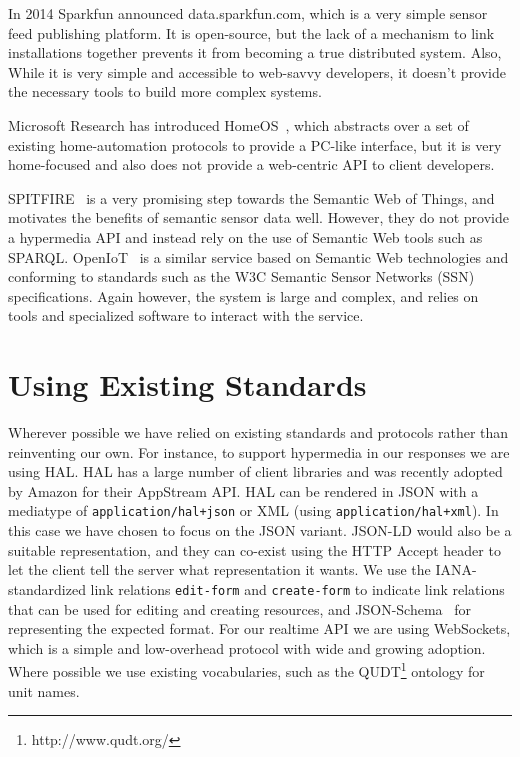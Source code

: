 \documentclass{acm_proc_article-sp}
\begin{document}
In 2014 Sparkfun announced data.sparkfun.com, which is a very simple sensor
feed publishing platform. It is open-source, but the lack of a mechanism to
link installations together prevents it from becoming a true distributed
system.  Also, While it is very simple and accessible to web-savvy developers,
it doesn't provide the necessary tools to build more complex systems.

Microsoft Research has introduced HomeOS~\cite{homeos}, which abstracts over a
set of existing home-automation protocols to provide a PC-like interface, but
it is very home-focused and also does not provide a web-centric API to client
developers.

SPITFIRE~\cite{spitfire} is a very promising step towards the Semantic Web of
Things, and motivates the benefits of semantic sensor data well.  However, they
do not provide a hypermedia API and instead rely on the use of Semantic Web
tools such as SPARQL. OpenIoT~\cite{openiot} is a similar service based on
Semantic Web technologies and conforming to standards such as the W3C Semantic
Sensor Networks (SSN) specifications. Again however, the system is large and
complex, and relies on tools and specialized software to interact with the
service.

\section{Using Existing Standards}

Wherever possible we have relied on existing standards and protocols rather
than reinventing our own. For instance, to support hypermedia in our responses
we are using HAL. HAL has a large number of client libraries and was recently
adopted by Amazon for their AppStream API.  HAL can be rendered in JSON with a
mediatype of \texttt{application/hal+json} or XML (using
\mbox{\texttt{application/hal+xml}}). In this case we have chosen to focus on
the JSON variant. JSON-LD would also be a suitable representation, and they can
co-exist using the HTTP Accept header to let the client tell the server what
representation it wants. We use the IANA-standardized link relations
\texttt{edit-form} and \texttt{create-form} to indicate link relations that can
be used for editing and creating resources, and
JSON-Schema~\cite{json-schema-draft} for representing the expected format. For
our realtime API we are using WebSockets, which is a simple and low-overhead
protocol with wide and growing adoption. Where possible we use existing
vocabularies, such as the QUDT\footnote{http://www.qudt.org/} ontology for unit
names.
\end{document}
